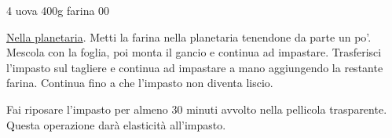 \cooktime[]{-}%
\begin{ingreds}
	4 uova
	400g farina 00

\end{ingreds}

\begin{method}
\underline{Nella planetaria}. Metti la farina nella planetaria tenendone da parte un po'. Mescola con la foglia, poi monta il gancio e continua ad impastare. Trasferisci l'impasto sul tagliere e continua ad impastare a mano aggiungendo la restante farina. Continua fino a che l'impasto non diventa liscio.

Fai riposare l'impasto per almeno 30 minuti avvolto nella pellicola trasparente. Questa operazione darà elasticità all'impasto.

\end{method}




